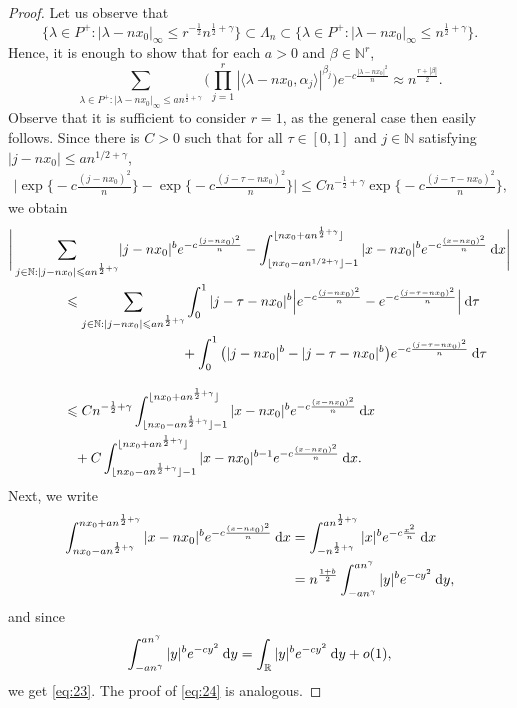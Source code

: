 \documentclass[11pt]{amsart}
\newcommand{\NN}{\mathbb{N}}
\newcommand{\RR}{\mathbb{R}}
\newcommand{\norm}[1]{\lvert {#1} \rvert}
\newcommand{\sprod}[2]{\langle {#1}, {#2} \rangle}
\theoremstyle{plain}
\theoremstyle{definition}
\numberwithin{equation}{section}
\begin{document}
\begin{proof}
	Let us observe that
	\[
		\Big\{\lambda \in P^+ : \norm{\lambda - n x_0}_{\infty} \leqslant r^{-\frac{1}{2}} n^{\frac{1}{2}+\gamma} \Big\}
		\subset
		\Lambda_n
		\subset
		\Big\{\lambda \in P^+ : \norm{\lambda - n x_0}_{\infty} \leqslant n^{\frac{1}{2}+\gamma} \Big\}.
	\]
	Hence, it is enough to show that for each $a > 0$ and $\beta \in \NN^r$,
	\[
		\sum_{\lambda \in P^+ : \norm{\lambda-n x_0}_{\infty} \leqslant an^{\frac{1}{2}+\gamma} } 
		\Big(\prod_{j = 1}^r |\sprod{\lambda - n x_0}{\alpha_j}|^{\beta_j} \Big)
		e^{-c \frac{\norm{\lambda-n x_0}^2}{n}}
		\approx 
		n^{\frac{r+|\beta|}{2}}.
	\]
	Observe that it is sufficient to consider $r = 1$, as the general case then easily follows. Since there is $C > 0$ such that
	for all $\tau \in [0, 1]$ and $j \in \NN$ satisfying $|j - n x_0| \leqslant a n^{1/2 + \gamma}$,
	\begin{align*}
		\Big|
		\exp\Big\{-c \frac{(j-n x_0)^2}{n}\Big\} - \exp\Big\{-c \frac{(j-\tau-n x_0)^2}{n}\Big\}
		\Big|
		\leqslant
		C n^{-\frac12+\gamma} \exp\Big\{-c \frac{(j-\tau-n x_0)^2}{n}\Big\},
	\end{align*}
	we obtain
	\begin{align*}
		&\Bigg|
		\sum_{j \in \NN : |j - n x_0| \leqslant a n^{\frac12+\gamma}} 
		\norm{j - nx_0}^b e^{-c \frac{(j-n x_0)^2}{n}}
		-
		\int_{\lfloor n x_0 - a n^{1/2+\gamma}\rfloor - 1}^{\lfloor n x_0 + a n^{\frac12+\gamma} \rfloor}
		|x-nx_0|^b e^{-c \frac{(x-n x_0)^2}{n}} {\: \rm d} x
		\Bigg| \\
		&\qquad\qquad\leqslant
		\sum_{j \in \NN : |j - n x_0| \leqslant a n^{\frac12+\gamma}}
		\int_0^1 
		|j - \tau -nx_0|^b
		\Big| e^{-c \frac{(j - n x_0)^2}{n}} - e^{-c \frac{(j-\tau-n x_0)^2}{n}}\Big| 
		{\: \rm d} \tau \\
		&\qquad\qquad\phantom{\leqslant \sum_{j \in \NN : |j - n x_0| \leqslant a n^{\frac12+\gamma}}}
		+
		\int_0^1 
		\big(|j - nx_0|^b - |j - \tau -nx_0|^b\big) e^{-c \frac{(j-\tau-n x_0)^2}{n}}
		{\: \rm d} \tau 
		\\
		&\qquad\qquad\leqslant
		C n^{-\frac12+\gamma} 
		\int_{\lfloor nx_0 - a n^{\frac12+\gamma}\rfloor-1}^{\lfloor nx_0 + a n^{\frac12+\gamma}\rfloor}
		|x-nx_0|^b e^{-c \frac{(x-nx_0)^2}{n}} {\: \rm d} x \\
		&\qquad\qquad\phantom{\leqslant}
		+ C
		\int_{\lfloor nx_0 - a n^{\frac12+\gamma}\rfloor-1}^{\lfloor nx_0 + a n^{\frac12+\gamma}\rfloor}
		|x - n x_0|^{b-1} e^{-c \frac{(x-nx_0)^2}{n}} {\: \rm d} x.
	\end{align*}
	Next, we write
	\begin{align*}
		\int_{nx_0 - a n^{\frac12+\gamma}}^{nx_0 + a n^{\frac12+\gamma}} 
		|x - n x_0|^b e^{-c \frac{(x-nx_0)^2}{n}} {\: \rm d} x
		&=
		\int_{-n^{\frac12+\gamma}}^{a n^{\frac12+\gamma}}
		|x|^b
		e^{-c\frac{x^2}{n}} {\: \rm d} x \\
		&=
		n^{\frac{1+b}{2}} \int_{-a n^{\gamma}}^{an^\gamma} |y|^b e^{-c y^2} {\: \rm d} y,
	\end{align*}
	and since
	\[
		\int_{-a n^{\gamma}}^{a n^\gamma} |y|^b e^{-c y^2} {\: \rm d} y =
		\int_\RR |y|^b e^{-c y^2} {\: \rm d} y + o(1),
	\]
	we get \eqref{eq:23}. The proof of \eqref{eq:24} is analogous.
\end{proof}
\end{document}

